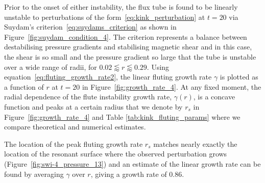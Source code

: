 \documentclass[fleqn,usenatbib]{mnras}
\newcommand{\rev}[1]{{\color{red} {#1}}}
\begin{document}
Prior to the onset of either instability, the flux tube is found to be linearly
unstable to perturbations of the form~\eqref{eq:kink_perturbation} at $t=20$
via Suydam's criterion~\eqref{eq:suydams_criterion} as shown in
Figure~\ref{fig:suydam_condition_4}. The criterion represents a
balance between destabilising pressure gradients and stabilising
magnetic shear and in this case, the shear is so small and the
pressure gradient so large that the tube is unstable over a wide range
of radii, for $ 0.02 \lessapprox r \lessapprox 0.29$.
\rev{Using equation~\eqref{eq:fluting_growth_rate2}, the} linear
fluting  growth rate $\gamma$ is plotted as a function of $r$ at
$t=20$ in Figure~\ref{fig:growth_rate_4}. \rev{At any fixed moment,
the radial dependence of the flute instability growth rate, $\gamma(r)$, is a concave
function and peaks at a certain radius that we denote by $r_s$ in
Figure~\ref{fig:growth_rate_4} and Table \ref{tab:kink_fluting_params}
where we compare theoretical and numerical estimates.}

The location of the peak \rev{fluting growth rate $r_s$} matches
nearly exactly the location of the resonant surface where the observed perturbation grows
(Figure~\ref{fig:swi-4_pressure_13}) and an estimate of the linear growth rate
can be found by averaging $\gamma$ over $r$, giving a growth rate of $0.86$.
\end{document}
